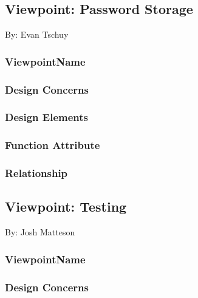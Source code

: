 \documentclass[letterpaper, 10pt, draftclsnofoot, compsoc, onecolumn]{IEEEtran}
\begin{document}
\subsection{Viewpoint: Password Storage}
{\noindent By: Evan Tschuy \par}

\subsubsection{ViewpointName}
{\noindent  \par}

\subsubsection{Design Concerns}
{\noindent  \par}

\subsubsection{Design Elements}
{\noindent  \par}

\subsubsection{Function Attribute}
{\noindent  \par}

\subsubsection{Relationship}






\newpage
\subsection{Viewpoint: Testing}
{\noindent By: Josh Matteson \par}

\subsubsection{ViewpointName}
{\noindent  \par}

\subsubsection{Design Concerns}
{\noindent  \par}
\end{document}
